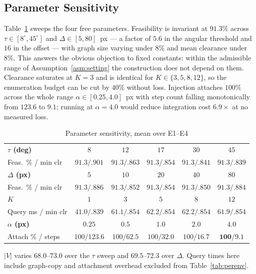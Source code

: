 \documentclass[conference]{IEEEtran}
\begin{document}
\subsection{Parameter Sensitivity}

Table~\ref{tab:sweep} sweeps the four free parameters. Feasibility is invariant at $91.3\%$ across $\tau\in[8^\circ,45^\circ]$ and $\Delta\in[5,80]$~px --- a factor of $5.6$ in the angular threshold and $16$ in the offset --- with graph size varying under $8\%$ and mean clearance under $8\%$. This answers the obvious objection to fixed constants: within the admissible range of Assumption~\ref{asm:setting} the construction does not depend on them. Clearance saturates at $K=3$ and is identical for $K\in\{3,5,8,12\}$, so the enumeration budget can be cut by $40\%$ without loss. Injection attaches $100\%$ across the whole range $\alpha\in[0.25,4.0]$~px with step count falling monotonically from $123.6$ to $9.1$; running at $\alpha=4.0$ would reduce integration cost $6.9\times$ at no measured loss.

\begin{table}[htbp]
\caption{Parameter sensitivity, mean over E1--E4}
\label{tab:sweep}
\begin{center}
\setlength{\tabcolsep}{2pt}
\begin{tabular}{@{}lccccc@{}}
\toprule
\textbf{$\tau$ (deg)} & $8$ & $12$ & $17$ & $30$ & $45$ \\
Feas.\ \% / min clr & $91.3/.901$ & $91.3/.863$ & $91.3/.854$ & $91.3/.841$ & $91.3/.839$ \\ \midrule
\textbf{$\Delta$ (px)} & $5$ & $10$ & $20$ & $40$ & $80$ \\
Feas.\ \% / min clr & $91.3/.886$ & $91.3/.852$ & $91.3/.854$ & $91.3/.850$ & $91.3/.884$ \\ \midrule
\textbf{$K$} & $1$ & $3$ & $5$ & $8$ & $12$ \\
Query ms / min clr & $41.0/.839$ & $61.1/.854$ & $62.2/.854$ & $62.2/.854$ & $61.9/.854$ \\ \midrule
\textbf{$\alpha$ (px)} & $0.25$ & $0.5$ & $1.0$ & $2.0$ & $4.0$ \\
Attach \% / steps & $100/123.6$ & $100/62.5$ & $100/32.0$ & $100/16.7$ & $\mathbf{100/9.1}$ \\ \bottomrule
\end{tabular}
\end{center}
\footnotesize $|V|$ varies $68.0$--$73.0$ over the $\tau$ sweep and $69.5$--$72.3$ over $\Delta$. Query times here include graph-copy and attachment overhead excluded from Table~\ref{tab:perenv}.
\end{table}
\end{document}
